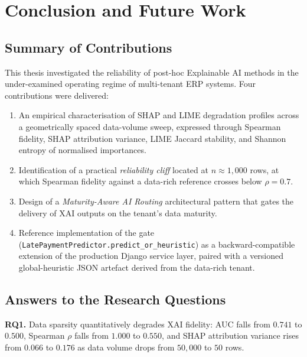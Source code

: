 \chapter{Conclusion and Future Work}
\label{ch:conclusion}

\section{Summary of Contributions}
\label{sec:conclusion_summary}

This thesis investigated the reliability of post-hoc Explainable AI methods in the under-examined operating regime of multi-tenant ERP systems. Four contributions were delivered:

\begin{enumerate}[label=\arabic*.]
  \item An empirical characterisation of SHAP and LIME degradation profiles across a geometrically spaced data-volume sweep, expressed through Spearman fidelity, SHAP attribution variance, LIME Jaccard stability, and Shannon entropy of normalised importances.

  \item Identification of a practical \emph{reliability cliff} located at $n \approx 1{,}000$ rows, at which Spearman fidelity against a data-rich reference crosses below $\rho = 0.7$.

  \item Design of a \emph{Maturity-Aware AI Routing} architectural pattern that gates the delivery of XAI outputs on the tenant's data maturity.

  \item Reference implementation of the gate (\texttt{LatePaymentPredictor.predict\_or\_heuristic}) as a backward-compatible extension of the production Django service layer, paired with a versioned global-heuristic JSON artefact derived from the data-rich tenant.
\end{enumerate}

\section{Answers to the Research Questions}
\label{sec:conclusion_rqs}

\textbf{RQ1.} Data sparsity quantitatively degrades XAI fidelity: AUC falls from $0.741$ to $0.500$, Spearman $\rho$ falls from $1.000$ to $0.550$, and SHAP attribution variance rises from $0.066$ to $0.176$ as data volume drops from $50{,}000$ to $50$ rows.

